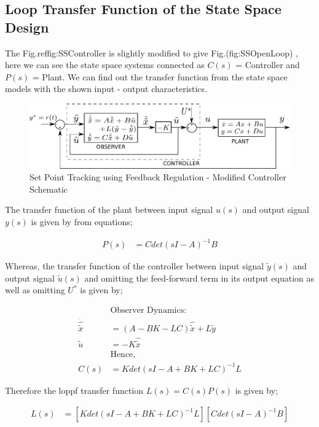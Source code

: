 \documentclass[11pt,usenames]{article}
\begin{document}
\subsection{Loop Transfer Function of the State Space Design}

The Fig.ref{fig:SSController} is slightly modified to give Fig.(fig:SSOpenLoop) , here we can see the state space systems connected as $C(s)$ = Controller and $P(s)$ = Plant. We can find out the transfer function from the state space models with the shown input - output characteristics.

\begin{figure}[htpb]
	\centering
	\includegraphics[width=0.75\columnwidth]{SSController_OpenLoopTF_Image.pdf}
	\caption{ Set Point Tracking using Feedback Regulation - Modified Controller Schematic }
	\label{fig:SSOpenLoop}
\end{figure}

The transfer function of the plant between input signal $u(s)$ and output signal $y(s)$ is given by from equations;

\begin{align} 
P(s)&=Cdet(sI-A)^{-1}B
\end{align}

Whereas, the transfer function of the controller between input signal $\tilde{y}(s)$ and output signal $\tilde{u}(s)$ and omitting the feed-forward term in its output equation as well as omitting $U^{*}$ is given by;

\begin{align}
&\text{Observer Dynamics:}\\
\dot{\hat{\tilde{x}}}&=(A-BK-LC)\hat{\tilde{x}}+L\tilde{y} \\
\tilde{u}&=-K\hat{\tilde{x}} \\
&\text{Hence,}\\
C(s)&=Kdet(sI-A+BK+LC)^{-1}L
\end{align}

Therefore the loppf transfer function $L(s)=C(s)P(s)$ is given by;

\begin{align} 
L(s)&=\left[ Kdet(sI-A+BK+LC)^{-1}L\right] \left[ Cdet(sI-A)^{-1}B\right] 
\end{align}
\end{document}

